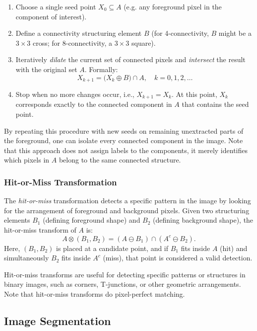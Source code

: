 \documentclass[a4paper,12pt]{article}
\begin{document}
\begin{enumerate}
    \item Choose a single seed point \( X_0 \subseteq A \) (e.g. any foreground pixel in the component of interest).
    \item Define a connectivity structuring element \(B\) (for 4-connectivity, \(B\) might be a \(3\times 3\) cross; for 8-connectivity, a \(3\times 3\) square).
    \item Iteratively \emph{dilate} the current set of connected pixels and \emph{intersect} the result with the original set \(A\). Formally:
    \[
      X_{k+1} = \bigl( X_k \oplus B \bigr) \cap A, \quad k = 0, 1, 2, \ldots
    \]
    \item Stop when no more changes occur, i.e., \( X_{k+1} = X_k \). At this point, \(X_k\) corresponds exactly to the connected component in \(A\) that contains the seed point.
\end{enumerate}

By repeating this procedure with new seeds on remaining unextracted parts of the foreground, one can isolate every connected component in the image. Note that this approach does not assign labels to the components, it merely identifies which pixels in \(A\) belong to the same connected structure.

\subsubsection{Hit-or-Miss Transformation}

The \emph{hit-or-miss} transformation detects a specific pattern in the image by looking for the arrangement of foreground and background pixels. Given two structuring elements \(B_1\) (defining foreground shape) and \(B_2\) (defining background shape), the hit-or-miss transform of \(A\) is:
\[
  A \otimes (B_1, B_2) = (A \ominus B_1) \cap (A^c \ominus B_2).
\]
Here, \((B_1, B_2)\) is placed at a candidate point, and if \(B_1\) fits inside \(A\) (hit) and simultaneously \(B_2\) fits inside \(A^c\) (miss), that point is considered a valid detection.

Hit-or-miss transforms are useful for detecting specific patterns or structures in binary images, such as corners, T-junctions, or other geometric arrangements. Note that hit-or-miss transforms do pixel-perfect matching.

\subsection{Image Segmentation}
\end{document}
